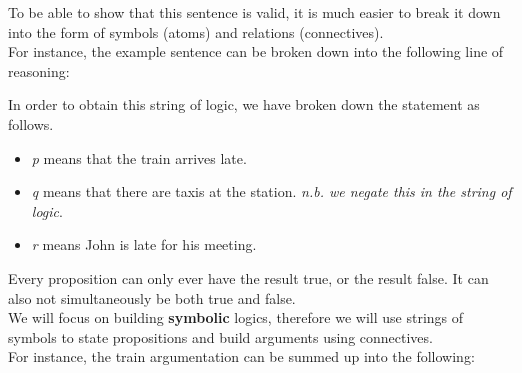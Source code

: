 
To be able to show that this sentence is valid, it is much easier to break it down into the form of symbols (atoms) and relations (connectives).\\

For instance, the example sentence can be broken down into the following line of reasoning:\\


In order to obtain this string of logic, we have broken down the statement as follows.\\

\begin{itemize}
\item \emph{p} means that the train arrives late.
\item \emph{q} means that there are taxis at the station. \emph{n.b. we negate this in the string of logic}.
\item \emph{r} means John is late for his meeting.
\end{itemize}


Every proposition can only ever have the result true, or the result false.  It can also not simultaneously be both true and false.\\

We will focus on building \textbf{symbolic} logics, therefore we will use strings of symbols to state propositions and build arguments using connectives.\\

For instance, the train argumentation can be summed up into the following:\\


